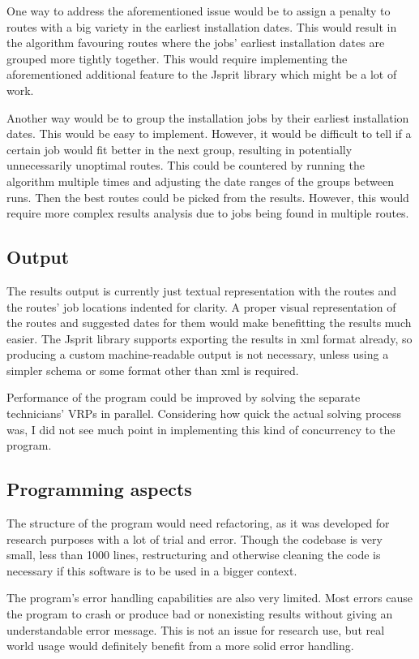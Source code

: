 One way to address the aforementioned issue would be to assign a penalty to routes with a big variety in the earliest installation dates. This would result in the algorithm favouring routes where the jobs' earliest installation dates are grouped more tightly together. This would require implementing the aforementioned additional feature to the Jsprit library which might be a lot of work. 

Another way would be to group the installation jobs by their earliest installation dates. This would be easy to implement. However, it would be difficult to tell if a certain job would fit better in the next group, resulting in potentially unnecessarily unoptimal routes. This could be countered by running the algorithm multiple times and adjusting the date ranges of the groups between runs. Then the best routes could be picked from the results. However, this would require more complex results analysis due to jobs being found in multiple routes. 

\subsection{Output}
The results output is currently just textual representation with the routes and the routes' job locations indented for clarity. A proper visual representation of the routes and suggested dates for them would make benefitting the results much easier. The Jsprit library supports exporting the results in xml format already, so producing a custom machine-readable output is not necessary, unless using a simpler schema or some format other than xml is required.

Performance of the program could be improved by solving the separate technicians' VRPs in parallel. Considering how quick the actual solving process was, I did not see much point in implementing this kind of concurrency to the program. 

\subsection{Programming aspects}
The structure of the program would need refactoring, as it was developed for research purposes with a lot of trial and error. Though the codebase is very small, less than 1000 lines, restructuring and otherwise cleaning the code is necessary if this software is to be used in a bigger context.

The program's error handling capabilities are also very limited. Most errors cause the program to crash or produce bad or nonexisting results without giving an understandable error message. This is not an issue for research use, but real world usage would definitely benefit from a more solid error handling. 

